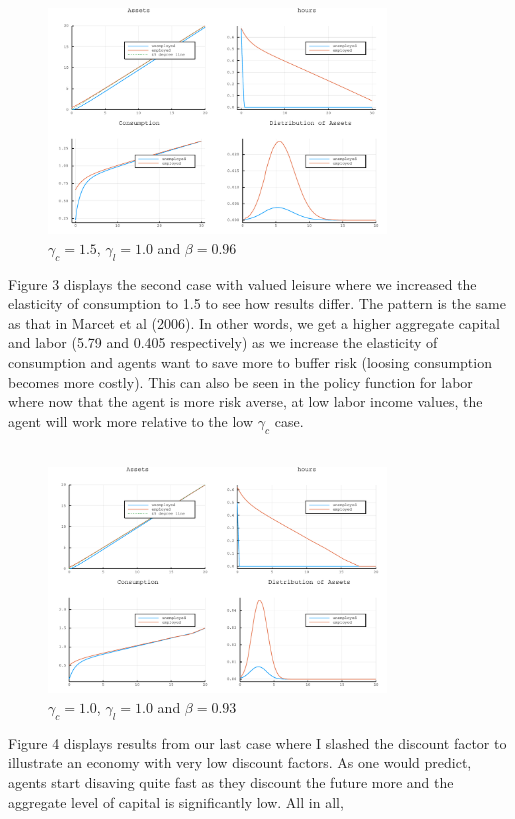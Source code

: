 \documentclass{article} %
\begin{document}
\begin{figure}[h!]
  \centering
  \includegraphics[width = 0.8\textwidth]{../ElasticLabor/Solution.pdf}
    \caption{$\gamma_c = 1.5$, $\gamma_l = 1.0$ and $\beta = 0.96$}
  \end{figure}
  Figure 3 displays the second case with valued leisure where we increased the elasticity of consumption to 1.5 to see how results differ. The pattern is the same as that in Marcet et al (2006). In other words, we get a higher aggregate capital and labor (5.79 and 0.405 respectively) as we increase the elasticity of consumption and agents want to save more to buffer risk (loosing consumption becomes more costly). This can also be seen in the policy function for labor where now that the agent is more risk averse, at low labor income values, the agent will work more relative to the low $\gamma_c$ case.  \\
  \\
\begin{figure}[h!]
  \centering
  \includegraphics[width = 0.8\textwidth]{../ElasticLabor/Solution3.pdf}
    \caption{$\gamma_c = 1.0$, $\gamma_l = 1.0$ and $\beta = 0.93$}
  \end{figure}
  Figure 4 displays results from our last case where I slashed the discount factor to illustrate an economy with very low discount factors. As one would predict, agents start disaving quite fast as they discount the future more and the aggregate level of capital is significantly low. All in all,   
  
\end{document}
